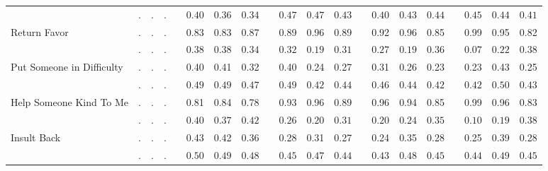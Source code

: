 \begin{center}
{\begin{longtable}{L{5cm} c c c p{.5cm} c c c p{.5cm} c c c p{.5cm} c c c p{.5cm} c c c}
& $\mathit{        .}$ & $\mathit{        .}$ & $\mathit{        .}$ & & $\mathit{     0.40}$ & $\mathit{     0.36}$ & $\mathit{     0.34}$ & & $\mathit{     0.47}$ & $\mathit{     0.47}$ & $\mathit{     0.43}$ & & $\mathit{     0.40}$ & $\mathit{     0.43}$ & $\mathit{     0.44}$ & & $\mathit{     0.45}$ & $\mathit{     0.44}$ & $\mathit{     0.41}$ \\[.7em]
Return Favor & . &         . &         . & &      0.83 &      0.83 &      0.87 & &      0.89 &      0.96 &      0.89 & &      0.92 &      0.96 &      0.85 & &      0.99 &      0.95 &      0.82 \\*
& $\mathit{        .}$ & $\mathit{        .}$ & $\mathit{        .}$ & & $\mathit{     0.38}$ & $\mathit{     0.38}$ & $\mathit{     0.34}$ & & $\mathit{     0.32}$ & $\mathit{     0.19}$ & $\mathit{     0.31}$ & & $\mathit{     0.27}$ & $\mathit{     0.19}$ & $\mathit{     0.36}$ & & $\mathit{     0.07}$ & $\mathit{     0.22}$ & $\mathit{     0.38}$ \\[.7em]
Put Someone in Difficulty & . &         . &         . & &      0.40 &      0.41 &      0.32 & &      0.40 &      0.24 &      0.27 & &      0.31 &      0.26 &      0.23 & &      0.23 &      0.43 &      0.25 \\*
& $\mathit{        .}$ & $\mathit{        .}$ & $\mathit{        .}$ & & $\mathit{     0.49}$ & $\mathit{     0.49}$ & $\mathit{     0.47}$ & & $\mathit{     0.49}$ & $\mathit{     0.42}$ & $\mathit{     0.44}$ & & $\mathit{     0.46}$ & $\mathit{     0.44}$ & $\mathit{     0.42}$ & & $\mathit{     0.42}$ & $\mathit{     0.50}$ & $\mathit{     0.43}$ \\[.7em]
Help Someone Kind To Me & . &         . &         . & &      0.81 &      0.84 &      0.78 & &      0.93 &      0.96 &      0.89 & &      0.96 &      0.94 &      0.85 & &      0.99 &      0.96 &      0.83 \\*
& $\mathit{        .}$ & $\mathit{        .}$ & $\mathit{        .}$ & & $\mathit{     0.40}$ & $\mathit{     0.37}$ & $\mathit{     0.42}$ & & $\mathit{     0.26}$ & $\mathit{     0.20}$ & $\mathit{     0.31}$ & & $\mathit{     0.20}$ & $\mathit{     0.24}$ & $\mathit{     0.35}$ & & $\mathit{     0.10}$ & $\mathit{     0.19}$ & $\mathit{     0.38}$ \\[.7em]
Insult Back & . &         . &         . & &      0.43 &      0.42 &      0.36 & &      0.28 &      0.31 &      0.27 & &      0.24 &      0.35 &      0.28 & &      0.25 &      0.39 &      0.28 \\*
& $\mathit{        .}$ & $\mathit{        .}$ & $\mathit{        .}$ & & $\mathit{     0.50}$ & $\mathit{     0.49}$ & $\mathit{     0.48}$ & & $\mathit{     0.45}$ & $\mathit{     0.47}$ & $\mathit{     0.44}$ & & $\mathit{     0.43}$ & $\mathit{     0.48}$ & $\mathit{     0.45}$ & & $\mathit{     0.44}$ & $\mathit{     0.49}$ & $\mathit{     0.45}$ \\[.7em]
\hline
\end{longtable}
}
\end{center}
